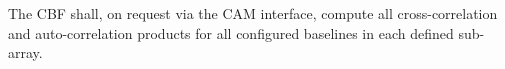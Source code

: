 The CBF shall, on request via the CAM interface, compute all cross-correlation
and auto-correlation products for all configured baselines in each defined
sub-array.
